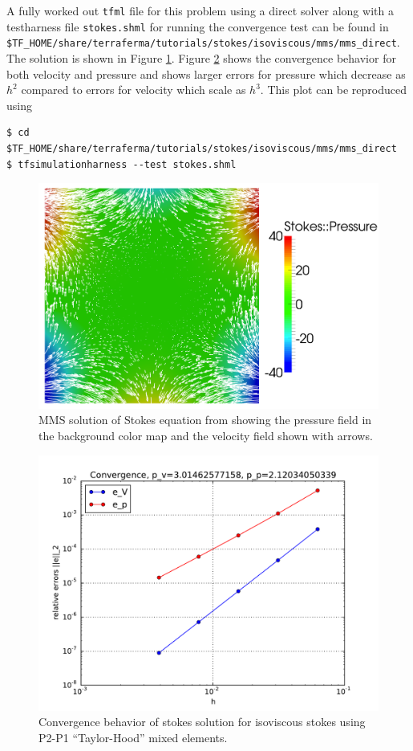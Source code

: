 A fully worked out \texttt{tfml} file for this problem using a direct
solver along with a testharness file \texttt{stokes.shml} for running
the convergence test can be
found in \texttt{\$TF\_HOME/share/terraferma/tutorials/stokes/isoviscous/mms/mms\_direct}.
The solution is shown in Figure \ref{fig:stokesMMS}.  Figure
\ref{fig:stokes_convergence}  shows the convergence behavior for both
velocity and pressure and shows larger errors for pressure which
decrease as $h^{2}$ compared to errors for velocity which scale as
$h^{3}$. This plot can be reproduced using
\begin{lstlisting}[style=Bash]
$ cd $TF_HOME/share/terraferma/tutorials/stokes/isoviscous/mms/mms_direct
$ tfsimulationharness --test stokes.shml
\end{lstlisting} %


\begin{figure}[htbp!]
  \centering
  \includegraphics[width=.7\textwidth]{figures/stokes_flow.png}
  \caption{MMS solution of Stokes equation from
    \cite{elman_finite_2005} showing the pressure field in the background color map and the velocity field shown with arrows.}
  \label{fig:stokesMMS}
\end{figure}
\begin{figure}[htbp!]
  \centering
  \includegraphics[width=.7\textwidth]{figures/Stokes_convergence.pdf}
  \caption{Convergence behavior of stokes solution for isoviscous
    stokes using P2-P1 ``Taylor-Hood'' mixed elements.}
  \label{fig:stokes_convergence}
\end{figure}

